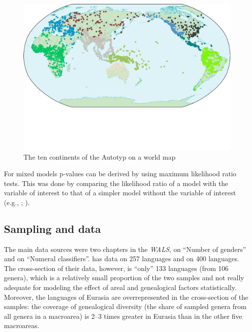 \documentclass[output=collectionpaper]{langsci/langscibook}
\begin{document}
\begin{figure}
\includegraphics[width=\textwidth]{figures/13/Fig1_Map10continents_s}
\caption{The ten continents of the Autotyp on a world map \citep{Bickel2017}}
\label{fig:Sinne:1}
\end{figure}

For mixed models p-values can be derived by using maximum likelihood ratio tests. This was done by comparing the likelihood ratio of a model with the variable of interest to that of a simpler model without the variable of interest (e.g., \citealt{Baayen2008}; \citealt{Barr2013}).


\subsection{Sampling and data}
\label{sec:Sinne:3.3}


The main data sources were two chapters in the \textit{WALS}, \citet{Corbett2013} on ``Number of genders'' and \citet{Gil2013} on ``Numeral classifiers''. \citet{Corbett2013} has data on 257 languages and \citet{Gil2013} on 400 languages. The cross-section of their data, however, is ``only'' 133 languages (from 106 genera), which is a relatively small proportion of the two samples and not really adequate for modeling the effect of areal and genealogical factors statistically. Moreover, the languages of Eurasia are overrepresented in the cross-section of the samples: the coverage of genealogical diversity (the share of sampled genera from all genera in a macroarea) is 2--3 times greater in Eurasia than in the other five macroareas.
\end{document}
